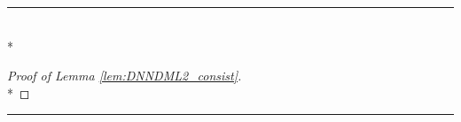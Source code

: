 \hrule

\begin{lem}\label{lem:DNNDML2_consist}\mbox{}\\*
    
\end{lem}

\begin{proof}[Proof of Lemma \ref{lem:DNNDML2_consist}]\mbox{}\\*
    
\end{proof}

\hrule

\begin{lem}\label{lem:residual_beh}
    
\end{lem}

